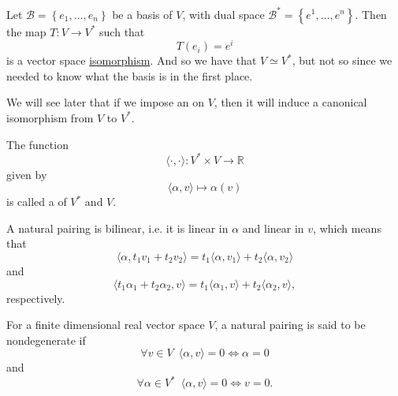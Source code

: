 \documentclass[notoc,notitlepage]{tufte-book}
\begin{document}
\begin{remark}
  Let $\mathcal{B} = \left\{ e_1, \ldots, e_n \right\}$ be a basis of $V$,
  with dual space $\mathcal{B}^* = \left\{ e^1, \ldots, e^n \right\}$.
  Then the map $T : V \to V^*$ such that
  \begin{equation*}
    T(e_i) = e^i
  \end{equation*}
  is a vector space \hyperref[defn:linear_isomorphism]{isomorphism}.
  And so we have that $V \simeq V^*$, but not  so
  since we needed to know what the basis is in the first place.
\end{remark}

We will see later that if we impose an  on $V$,
then it will induce a canonical isomorphism from $V$ to $V^*$.

\begin{defn}\label{defn:natural_pairing}
  The function
  \begin{equation*}
    \langle \cdot, \cdot \rangle : V^* \times V \to \mathbb{R}
  \end{equation*}
  given by
  \begin{equation*}
    \langle \alpha, v \rangle \mapsto \alpha (v)
  \end{equation*}
  is called a  of $V^*$ and $V$.
\end{defn}

\begin{note}
  A natural pairing is bilinear,
  i.e. it is linear in $\alpha$ and linear in $v$,
  which means that
  \begin{equation*}
    \langle \alpha, t_1 v_1 + t_2 v_2 \rangle
    = t_1 \langle \alpha, v_1 \rangle + t_2 \langle \alpha, v_2 \rangle
  \end{equation*}
  and
  \begin{equation*}
    \langle t_1 \alpha_1 + t_2 \alpha_2, v \rangle
    = t_1 \langle \alpha_1, v \rangle + t_2 \langle \alpha_2, v \rangle,
  \end{equation*}
  respectively.
\end{note}

\begin{propo}\label{propo:natural_pairings_are_nondegenerate}
  For a finite dimensional real vector space $V$,
  a natural pairing is said to be nondegenerate if
  \begin{equation*}
    \forall v \in V \enspace \langle \alpha, v \rangle = 0 \iff \alpha = 0
  \end{equation*}
  and
  \begin{equation*}
    \forall \alpha \in V^* \enspace \langle \alpha, v \rangle = 0 \iff v = 0.
  \end{equation*}
\end{propo}
\end{document}
